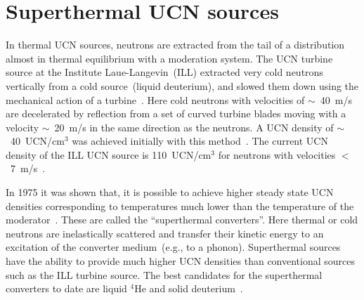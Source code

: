 \section{Superthermal UCN sources}
\label{sec:ucn_with_heII}



In thermal UCN sources, neutrons are extracted from the tail of a
distribution almost in thermal equilibrium with a moderation
system. The UCN turbine source at the Institute Laue-Langevin~(ILL)
extracted very cold neutrons vertically from a cold source~(liquid
deuterium), and slowed them down using the mechanical action of a
turbine~\cite{Steyerl1986,Steyerl1975}. Here cold neutrons with
velocities of $\sim$~40~m/s are decelerated by reflection from a set
of curved turbine blades moving with a velocity $\sim$~20~m/s in the
same direction as the neutrons. A UCN density of $\sim$~40~UCN/cm$^3$
was achieved initially with this
method~\cite{ucnbook,Albert_talk}. The current UCN density of the ILL
UCN source is 110~UCN/cm$^3$ for neutrons with velocities
$<$~7~m/s~\cite{Steyerl1986}.



In 1975 it was shown that, it is possible to achieve higher steady
state UCN densities corresponding to temperatures much lower than the
temperature of the moderator~\cite{Golub75}. These are called the
``superthermal converters''. Here thermal or cold neutrons are
inelastically scattered and transfer their kinetic energy to an
excitation of the converter medium~(e.g., to a phonon).  Superthermal
sources have the ability to provide much higher UCN densities than
conventional sources such as the ILL turbine source. The best
candidates for the superthermal converters to date are liquid $^4$He
and solid deuterium~\cite{ucnbook}.




